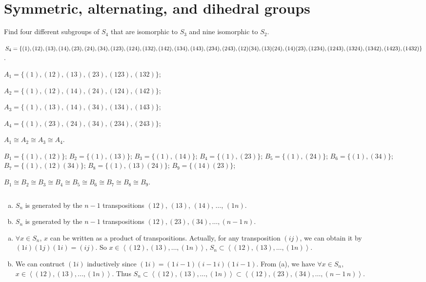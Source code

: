\section{Symmetric, alternating, and dihedral groups}
\begin{ex}
    Find four different subgroups of $S_{4}$ that are isomorphic to $S_{3}$ and nine isomorphic to $S_{2}$.
\end{ex}

\begin{answer}
    $S_{4}=\{(1), (12), (13), (14), (23), (24), (34), (123), (124), (132),\\ (142), (134), (143), (234), (243), (12)(34), (13)(24), (14)(23), (1234),\\ (1243), (1324), (1342), (1423), (1432)\}$.

    $A_{1}=\{(1), (12), (13), (23), (123), (132)\}$;

    $A_{2}=\{(1), (12), (14), (24), (124), (142)\}$;

    $A_{3}=\{(1), (13), (14), (34), (134), (143)\}$;

    $A_{4}=\{(1), (23), (24), (34), (234), (243)\}$;
    
    $A_{1}\cong A_{2}\cong A_{3}\cong A_{4}$.

    $B_{1}=\{(1), (12)\}$; $B_{2}=\{(1),(13)\}$; $B_{3}=\{(1),(14)\}$; $B_{4}=\{(1), (23)\}$; $B_{5}=\{(1),(24)\}$; $B_{6}=\{(1), (34)\}$; $B_{7}=\{(1),(12)(34)\}$; $B_{8}=\{(1),(13)(24)\}$; $B_{9}=\{(14)(23)\}$;

    $B_{1}\cong B_{2}\cong B_{3}\cong B_{4}\cong B_{5}\cong B_{6}\cong B_{7}\cong B_{8}\cong B_{9}$.
\end{answer}

$$ $$

\begin{ex}
    \begin{enumerate}[(a)]
        \item $S_{n}$ is generated by the $n-1$ transpositions $(12)$, $(13)$, $(14)$, $\dots$, $(1n)$.
        \item $S_{n}$ is generated by the $n-1$ transpositions $(12), (23), (34),\dots, (n-1\, n)$.
    \end{enumerate}
\end{ex}

\begin{answer}
    \begin{enumerate}[(a)]
        \item $\forall x\in S_{n}$, $x$ can be written as a product of transpositions. Actually, for any transposition $(ij)$, we can obtain it by $(1i)(1j)(1i)=(ij)$. So $x\in \left\langle (12), (13),\dots,(1n)\right\rangle$, $S_{n}\subset\left\langle(12), (13),\dots,(1n)\right\rangle$.
        \item We can contruct $(1i)$ inductively since $(1i)=(1\, i-1)(i-1\, i)(1\, i-1)$. From (a), we have $\forall x\in S_{n}$, $x\in \left\langle (12), (13),\dots,(1n)\right\rangle$. Thus $S_{n}\subset\left\langle(12), (13),\dots,(1n)\right\rangle\subset \left\langle (12), (23), (34),\dots, (n-1\, n)\right\rangle$.
    \end{enumerate}
\end{answer}


